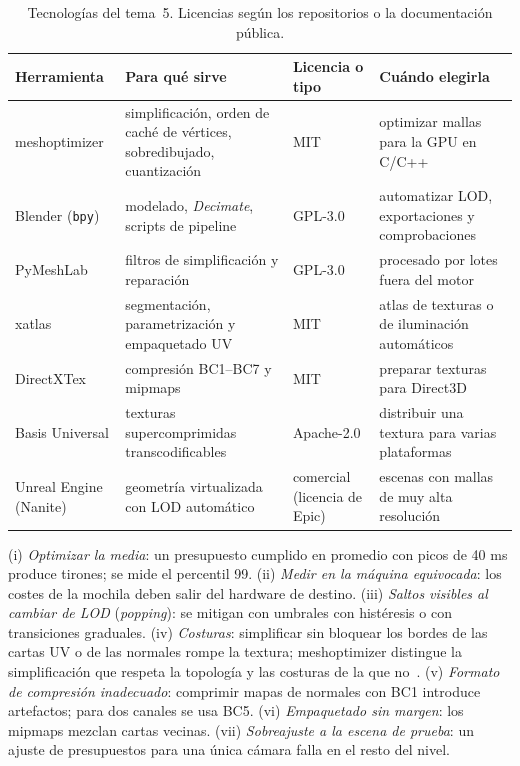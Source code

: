 \begin{table}[h]
\centering\small
\begin{tabularx}{\textwidth}{@{}l>{\raggedright\arraybackslash}X>{\raggedright\arraybackslash}p{2.6cm}>{\raggedright\arraybackslash}X@{}}
\toprule
Herramienta & Para qué sirve & Licencia o tipo & Cuándo elegirla \\
\midrule
meshoptimizer & simplificación, orden de caché de vértices, sobredibujado, cuantización & MIT & optimizar mallas para la GPU en C/C++ \\
Blender (\texttt{bpy}) & modelado, \emph{Decimate}, scripts de pipeline & GPL-3.0 & automatizar LOD, exportaciones y comprobaciones \\
PyMeshLab & filtros de simplificación y reparación & GPL-3.0 & procesado por lotes fuera del motor \\
xatlas & segmentación, parametrización y empaquetado UV & MIT & atlas de texturas o de iluminación automáticos \\
DirectXTex & compresión BC1--BC7 y mipmaps & MIT & preparar texturas para Direct3D \\
Basis Universal & texturas supercomprimidas transcodificables & Apache-2.0 & distribuir una textura para varias plataformas \\
Unreal Engine (Nanite) & geometría virtualizada con LOD automático & comercial (licencia de Epic) & escenas con mallas de muy alta resolución \\
\bottomrule
\end{tabularx}
\caption{Tecnologías del tema~5. Licencias según los repositorios o la documentación pública.}
\label{tab:tec5}
\end{table}

\begin{observacion}\label{obs:errores5}
(i) \emph{Optimizar la media}: un presupuesto cumplido en promedio con picos de 40 ms produce tirones; se mide el percentil 99. (ii) \emph{Medir en la máquina equivocada}: los costes de la mochila deben salir del hardware de destino. (iii) \emph{Saltos visibles al cambiar de LOD} (\emph{popping}): se mitigan con umbrales con histéresis o con transiciones graduales. (iv) \emph{Costuras}: simplificar sin bloquear los bordes de las cartas UV o de las normales rompe la textura; meshoptimizer distingue la simplificación que respeta la topología y las costuras de la que no~\cite{meshopt}. (v) \emph{Formato de compresión inadecuado}: comprimir mapas de normales con BC1 introduce artefactos; para dos canales se usa BC5. (vi) \emph{Empaquetado sin margen}: los mipmaps mezclan cartas vecinas. (vii) \emph{Sobreajuste a la escena de prueba}: un ajuste de presupuestos para una única cámara falla en el resto del nivel.
\end{observacion}

